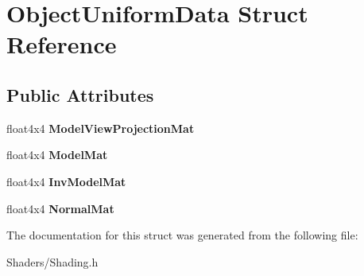 \hypertarget{structObjectUniformData}{}\section{Object\+Uniform\+Data Struct Reference}
\label{structObjectUniformData}
\subsection*{Public Attributes}
\begin{DoxyCompactItemize}
\item 
\mbox{\label{structObjectUniformData_ad6739bfab754e73bb9ed54ac616fac51}} 
float4x4 {\bfseries Model\+View\+Projection\+Mat}
\item 
\mbox{\label{structObjectUniformData_ad92d0621c7f64d8552c1bf056df5950a}} 
float4x4 {\bfseries Model\+Mat}
\item 
\mbox{\label{structObjectUniformData_a945494826cf458253f9e3e33ebdc66ea}} 
float4x4 {\bfseries Inv\+Model\+Mat}
\item 
\mbox{\label{structObjectUniformData_a3a92416b04f38e5d2cec4f5d2a67b504}} 
float4x4 {\bfseries Normal\+Mat}
\end{DoxyCompactItemize}


The documentation for this struct was generated from the following file\+:\begin{DoxyCompactItemize}
\item 
Shaders/Shading.\+h\end{DoxyCompactItemize}
